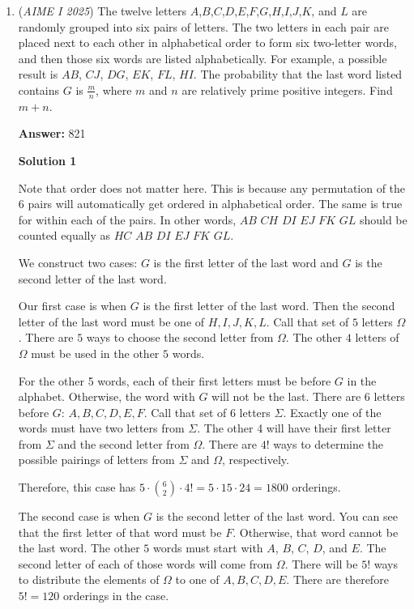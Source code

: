 \begin{enumerate}
 
 \[2 \cdot 144 + 2 \cdot 108\]
 \[=288 + 216\]
 \[= \boxed{504}\].

 


	\item (\textit{AIME I 2025}) The twelve letters $A$,$B$,$C$,$D$,$E$,$F$,$G$,$H$,$I$,$J$,$K$, and $L$ are randomly grouped into six pairs of letters. The two letters in each pair are placed next to each other in alphabetical order to form six two-letter words, and then those six words are listed alphabetically. For example, a possible result is $AB$, $CJ$, $DG$, $EK$, $FL$, $HI$. The probability that the last word listed contains $G$ is $\frac mn$, where $m$ and $n$ are relatively prime positive integers. Find $m+n$.


 
 \textbf{Answer: }821



\textbf{Solution 1}

Note that order does not matter here. This is because any permutation of the $6$ pairs will automatically get ordered in alphabetical order. The same is true for within each of the pairs. In other words, $AB$ $CH$ $DI$ $EJ$ $FK$ $GL$ should be counted equally as $HC$ $AB$ $DI$ $EJ$ $FK$ $GL$.

 We construct two cases: $G$ is the first letter of the last word and $G$ is the second letter of the last word.

 Our first case is when $G$ is the first letter of the last word. Then the second letter of the last word must be one of $H, I, J, K, L$. Call that set of $5$ letters $\Omega$. There are $5$ ways to choose the second letter from $\Omega$. The other $4$ letters of $\Omega$ must be used in the other $5$ words.

 For the other 5 words, each of their first letters must be before $G$ in the alphabet. Otherwise, the word with $G$ will not be the last. There are $6$ letters before $G$: $A,B,C,D,E,F$. Call that set of $6$ letters $\Sigma$. Exactly one of the words must have two letters from $\Sigma$. The other 4 will have their first letter from $\Sigma$ and the second letter from $\Omega$. There are $4!$ ways to determine the possible pairings of letters from $\Sigma$ and $\Omega$, respectively.

 Therefore, this case has $5 \cdot {6\choose{2}} \cdot 4! = 5 \cdot 15 \cdot 24 = 1800$ orderings.

 The second case is when $G$ is the second letter of the last word. You can see that the first letter of that word must be $F$. Otherwise, that word cannot be the last word. The other $5$ words must start with $A$, $B$, $C$, $D$, and $E$. The second letter of each of those words will come from $\Omega$. There will be $5!$ ways to distribute the elements of $\Omega$ to one of $A, B, C, D, E$. There are therefore $5! = 120$ orderings in the case.


\end{enumerate}
